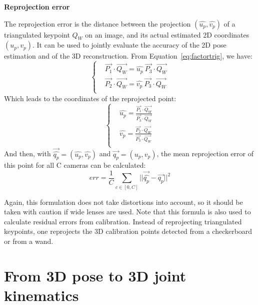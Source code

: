 \vspace*{0.5cm}
\noindent\textbf{Reprojection error}  

The reprojection error is the distance between the projection $(\widehat{u_p}, \widehat{v_p})$ of a triangulated keypoint $Q_W$ on an image, and its actual estimated 2D coordinates $(u_p, v_p)$. It can be used to jointly evaluate the accuracy of the 2D pose estimation and of the 3D reconstruction. From Equation~\ref{eq:factortrig}, we have:
\begin{equation}
    \begin{cases}
      &  \overrightarrow{P_1}\cdot \overrightarrow{Q_W} = \widehat{u_p} \ \overrightarrow{P_3} \cdot \overrightarrow{Q_W}\\
      &  \overrightarrow{P_2} \cdot \overrightarrow{Q_W} = \widehat{v_p} \ \overrightarrow{P_3} \cdot \overrightarrow{Q_W}\\
    \end{cases}
\end{equation}
Which leads to the coordinates of the reprojected point:
\begin{equation}
    \begin{cases}
      & \widehat{u_p} = \frac{\overrightarrow{P_1}\cdot \overrightarrow{Q_W}}{\overrightarrow{P_3} \cdot \overrightarrow{Q_W}}\\
      & \widehat{v_p} = \frac{\overrightarrow{P_2}\cdot \overrightarrow{Q_W}}{\overrightarrow{P_3} \cdot \overrightarrow{Q_W}}\\
    \end{cases}
\end{equation}
And then, with $\overrightarrow{\widehat{q_p}} = (\widehat{u_p}, \widehat{v_p})$ and $\overrightarrow{q_p} = (u_p, v_p)$, the mean reprojection error of this point for all C cameras can be calculated:
\begin{equation}
  \boxed{
  err = \frac{1}{C} \sum_{c \in [0,C]} ||\overrightarrow{\widehat{q_p}}-\overrightarrow{q_p}||^2 
  }
\end{equation}

Again, this formulation does not take distortions into account, so it should be taken with caution if wide lenses are used. Note that this formula is also used to calculate residual errors from calibration. Instead of reprojecting triangulated keypoints, one reprojects the 3D calibration points detected from a checkerboard or from a wand.



\newpage
\section{From 3D pose to 3D joint kinematics}\label{sec:3D joint kin}

